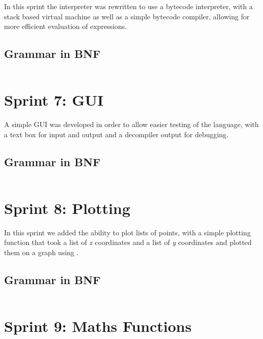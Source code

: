 \documentclass[a4paper, oneside, 11pt]{report}
\begin{document}
In this sprint the interpreter was rewritten to use a bytecode interpreter, with a stack based virtual machine as 
well as a simple bytecode compiler, allowing for more efficient evaluation of expressions.

\subsection{Grammar in BNF}\label{subsec:grammar-in-bnf6}

\begin{verbatim}
\end{verbatim}

\section{Sprint 7: GUI}\label{sec:gui}

A simple GUI was developed in order to allow easier testing of the language, with a text box for input and output and a 
decompiler output for debugging.

\subsection{Grammar in BNF}\label{subsec:grammar-in-bnf7}

\begin{verbatim}
\end{verbatim}

\section{Sprint 8: Plotting}\label{sec:plotting1}

In this sprint we added the ability to plot lists of points, with a simple plotting function that took a list of
\textit{x} coordinates and a list of \textit{y} coordinates and plotted them on a graph using \citet{scottPlot}.

\subsection{Grammar in BNF}\label{subsec:grammar-in-bnf8}

\begin{verbatim}
\end{verbatim}

\section{Sprint 9: Maths Functions}\label{sec:maths-funcs}
\end{document}
